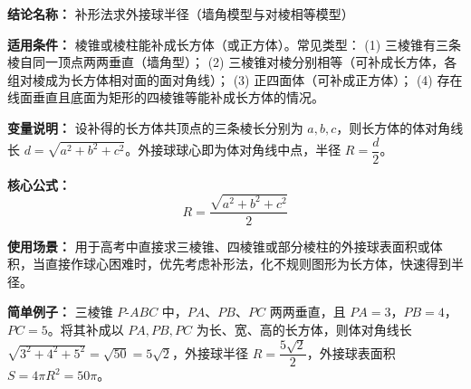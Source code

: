 \textbf{结论名称：} 补形法求外接球半径（墙角模型与对棱相等模型）

\textbf{适用条件：} 棱锥或棱柱能补成长方体（或正方体）。常见类型：  
(1) 三棱锥有三条棱自同一顶点两两垂直（墙角型）；  
(2) 三棱锥对棱分别相等（可补成长方体，各组对棱成为长方体相对面的面对角线）；  
(3) 正四面体（可补成正方体）；  
(4) 存在线面垂直且底面为矩形的四棱锥等能补成长方体的情况。

\textbf{变量说明：} 设补得的长方体共顶点的三条棱长分别为 \(a,b,c\)，则长方体的体对角线长 \(d=\sqrt{a^{2}+b^{2}+c^{2}}\)。外接球球心即为体对角线中点，半径 \(R=\dfrac{d}{2}\)。

\textbf{核心公式：} 
\[
\boxed{R = \frac{\sqrt{a^{2}+b^{2}+c^{2}}}{2}}
\]

\textbf{使用场景：} 用于高考中直接求三棱锥、四棱锥或部分棱柱的外接球表面积或体积，当直接作球心困难时，优先考虑补形法，化不规则图形为长方体，快速得到半径。

\textbf{简单例子：} 三棱锥 \(P\text{-}ABC\) 中，\(PA\)、\(PB\)、\(PC\) 两两垂直，且 \(PA=3\)，\(PB=4\)，\(PC=5\)。将其补成以 \(PA,PB,PC\) 为长、宽、高的长方体，则体对角线长 
\(\sqrt{3^{2}+4^{2}+5^{2}}=\sqrt{50}=5\sqrt{2}\)，外接球半径 \(R=\dfrac{5\sqrt{2}}{2}\)，外接球表面积 \(S=4\pi R^{2}=50\pi\)。